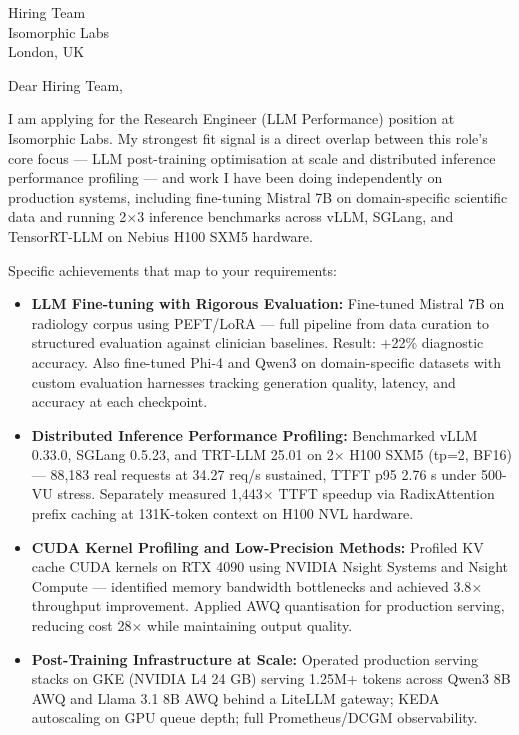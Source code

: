 \documentclass[11pt,a4paper]{letter}
\begin{document}
\begin{letter}{Hiring Team \\ Isomorphic Labs \\ London, UK}

\opening{Dear Hiring Team,}

I am applying for the Research Engineer (LLM Performance) position at Isomorphic Labs. My strongest fit signal is a direct overlap between this role's core focus — LLM post-training optimisation at scale and distributed inference performance profiling — and work I have been doing independently on production systems, including fine-tuning Mistral 7B on domain-specific scientific data and running 2$\times$3 inference benchmarks across vLLM, SGLang, and TensorRT-LLM on Nebius H100 SXM5 hardware.

Specific achievements that map to your requirements:

\begin{itemize}
  \item \textbf{LLM Fine-tuning with Rigorous Evaluation:} Fine-tuned Mistral 7B on radiology corpus using PEFT/LoRA — full pipeline from data curation to structured evaluation against clinician baselines. Result: +22\% diagnostic accuracy. Also fine-tuned Phi-4 and Qwen3 on domain-specific datasets with custom evaluation harnesses tracking generation quality, latency, and accuracy at each checkpoint.

  \item \textbf{Distributed Inference Performance Profiling:} Benchmarked vLLM 0.33.0, SGLang 0.5.23, and TRT-LLM 25.01 on 2$\times$ H100 SXM5 (tp=2, BF16) — 88,183 real requests at 34.27 req/s sustained, TTFT p95 2.76 s under 500-VU stress. Separately measured 1,443$\times$ TTFT speedup via RadixAttention prefix caching at 131K-token context on H100 NVL hardware.

  \item \textbf{CUDA Kernel Profiling and Low-Precision Methods:} Profiled KV cache CUDA kernels on RTX 4090 using NVIDIA Nsight Systems and Nsight Compute — identified memory bandwidth bottlenecks and achieved 3.8$\times$ throughput improvement. Applied AWQ quantisation for production serving, reducing cost 28$\times$ while maintaining output quality.

  \item \textbf{Post-Training Infrastructure at Scale:} Operated production serving stacks on GKE (NVIDIA L4 24 GB) serving 1.25M+ tokens across Qwen3 8B AWQ and Llama 3.1 8B AWQ behind a LiteLLM gateway; KEDA autoscaling on GPU queue depth; full Prometheus/DCGM observability.
\end{itemize}


\end{letter}
\end{document}
